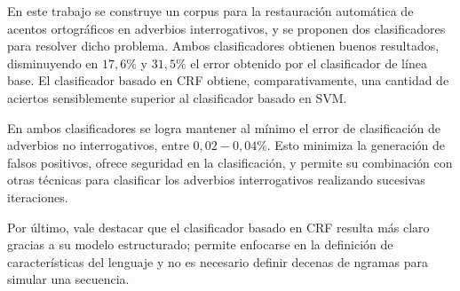 \documentclass[runningheads,a4paper]{llncs}
\begin{document}
En este trabajo se construye un corpus para la restauración automática de acentos ortográficos en adverbios interrogativos, y se proponen dos clasificadores para resolver dicho problema. Ambos clasificadores obtienen buenos resultados, disminuyendo en $17,6\%$ y $31,5\%$ el error obtenido por el clasificador de línea base. El clasificador basado en CRF obtiene, comparativamente, una cantidad de aciertos sensiblemente superior al clasificador basado en SVM. 

En ambos clasificadores se logra mantener al m\'inimo el error de clasificaci\'on de adverbios no interrogativos, entre $0,02-0,04\%$. Esto minimiza la generaci\'on de falsos positivos, ofrece seguridad en la clasificaci\'on, y permite su combinaci\'on con otras t\'ecnicas para clasificar los adverbios interrogativos realizando sucesivas iteraciones.

Por \'ultimo, vale destacar que el clasificador basado en CRF resulta m\'as claro gracias a su modelo estructurado; permite enfocarse en la definición de características del lenguaje y no es necesario definir decenas de ngramas para simular una secuencia.



\end{document}
